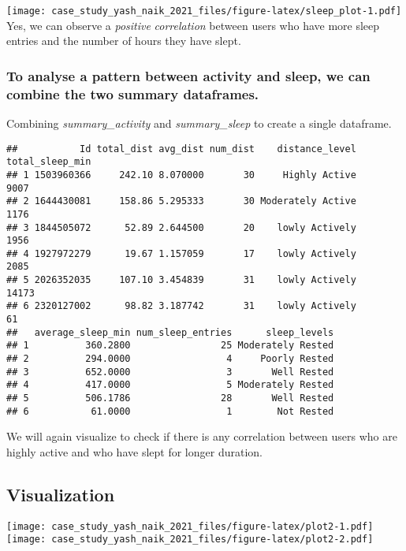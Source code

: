 \documentclass[
]{article}
\begin{document}
\texttt{[image: case\_study\_yash\_naik\_2021\_files/figure-latex/sleep\_plot-1.pdf]}
Yes, we can observe a \emph{positive} \emph{correlation} between users
who have more sleep entries and the number of hours they have slept.

\hypertarget{to-analyse-a-pattern-between-activity-and-sleep-we-can-combine-the-two-summary-dataframes.}{%
\subsubsection{To analyse a pattern between activity and sleep, we can
combine the two summary
dataframes.}\label{to-analyse-a-pattern-between-activity-and-sleep-we-can-combine-the-two-summary-dataframes.}}

Combining \emph{summary\_activity} and \emph{summary\_sleep} to create a
single dataframe.

\begin{verbatim}
##           Id total_dist avg_dist num_dist    distance_level total_sleep_min
## 1 1503960366     242.10 8.070000       30     Highly Active            9007
## 2 1644430081     158.86 5.295333       30 Moderately Active            1176
## 3 1844505072      52.89 2.644500       20    lowly Actively            1956
## 4 1927972279      19.67 1.157059       17    lowly Actively            2085
## 5 2026352035     107.10 3.454839       31    lowly Actively           14173
## 6 2320127002      98.82 3.187742       31    lowly Actively              61
##   average_sleep_min num_sleep_entries      sleep_levels
## 1          360.2800                25 Moderately Rested
## 2          294.0000                 4     Poorly Rested
## 3          652.0000                 3       Well Rested
## 4          417.0000                 5 Moderately Rested
## 5          506.1786                28       Well Rested
## 6           61.0000                 1        Not Rested
\end{verbatim}

We will again visualize to check if there is any correlation between
users who are highly active and who have slept for longer duration.

\hypertarget{visualization}{%
\subsection{Visualization}\label{visualization}}

\texttt{[image: case\_study\_yash\_naik\_2021\_files/figure-latex/plot2-1.pdf]}
\texttt{[image: case\_study\_yash\_naik\_2021\_files/figure-latex/plot2-2.pdf]}
\end{document}
